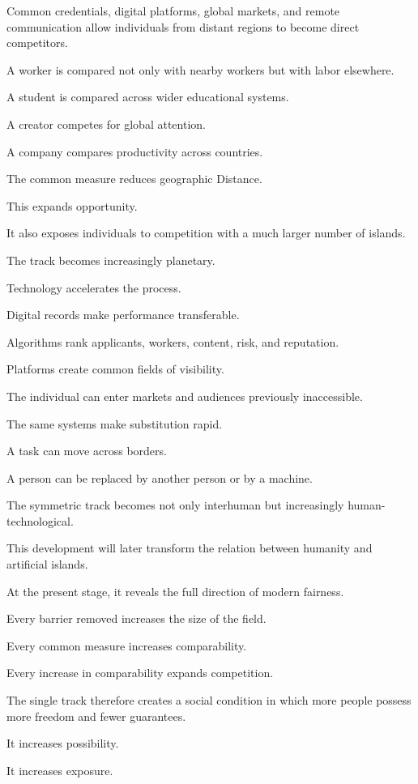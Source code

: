 Common credentials, digital platforms, global markets, and remote communication allow individuals from distant regions to become direct competitors.

A worker is compared not only with nearby workers but with labor elsewhere.

A student is compared across wider educational systems.

A creator competes for global attention.

A company compares productivity across countries.

The common measure reduces geographic Distance.

This expands opportunity.

It also exposes individuals to competition with a much larger number of islands.

The track becomes increasingly planetary.

Technology accelerates the process.

Digital records make performance transferable.

Algorithms rank applicants, workers, content, risk, and reputation.

Platforms create common fields of visibility.

The individual can enter markets and audiences previously inaccessible.

The same systems make substitution rapid.

A task can move across borders.

A person can be replaced by another person or by a machine.

The symmetric track becomes not only interhuman but increasingly human-technological.

This development will later transform the relation between humanity and artificial islands.

At the present stage, it reveals the full direction of modern fairness.

Every barrier removed increases the size of the field.

Every common measure increases comparability.

Every increase in comparability expands competition.

The single track therefore creates a social condition in which more people possess more freedom and fewer guarantees.

It increases possibility.

It increases exposure.

